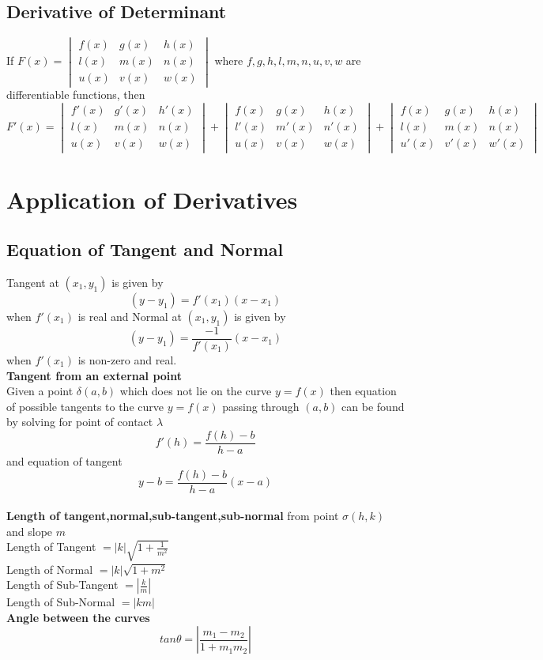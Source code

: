 \documentclass[12pt]{article}
\begin{document}
\subsection{Derivative of Determinant}
If $F(x)= 
\begin{vmatrix}
f(x) & g(x) & h(x)\\
l(x) & m(x) & n(x)\\
u(x) & v(x) & w(x)
\end{vmatrix}$
where $f,g,h,l,m,n,u,v,w$ are differentiable functions, then
$F'(x)= \begin{vmatrix}
f'(x) & g'(x) & h'(x)\\
l(x) & m(x) & n(x)\\
u(x) & v(x) & w(x)
\end{vmatrix} +
\begin{vmatrix}
f(x) & g(x) & h(x)\\
l'(x) & m'(x) & n'(x)\\
u(x) & v(x) & w(x)
\end{vmatrix} +
\begin{vmatrix}
f(x) & g(x) & h(x)\\
l(x) & m(x) & n(x)\\
u'(x) & v'(x) & w'(x)
\end{vmatrix}
$
\section{Application of Derivatives}
\subsection{Equation of Tangent and Normal}
Tangent at $(x_1,y_1)$ is given by $$(y-y_1)=f'(x_1)(x-x_1)$$ when $f'(x_1)$ is real and Normal at $(x_1,y_1)$ is given by $$(y-y_1)=\frac{-1}{f'(x_1)}(x-x_1)$$ when $f'(x_1)$ is non-zero and real.\\
\textbf{Tangent from an external point} \\
Given a point $\delta(a,b)$ which does not lie on the curve $y=f(x)$
then equation of possible tangents to the curve $y=f(x)$ passing through $(a,b)$ can be found by solving for point of contact $\lambda$
$$f'(h)=\frac{f(h)-b}{h-a}$$ 
and equation of tangent $$ y-b=\frac{f(h)-b}{h-a} (x-a) $$ \\
\textbf{Length of tangent,normal,sub-tangent,sub-normal} from point $\sigma(h,k)$ and slope $m$\\
Length of Tangent $=|k|\sqrt{1+ \frac{1}{m^2}}$ \\
Length of Normal  $=|k|\sqrt{1+ m^2}$ \\
Length of Sub-Tangent $=|\frac{k}{m}|$ \\
Length of Sub-Normal $=|km|$ \\
\textbf{Angle between the curves}
$$tan\theta=|\frac{m_1-m_2}{1+m_1m_2}|$$
\end{document}
